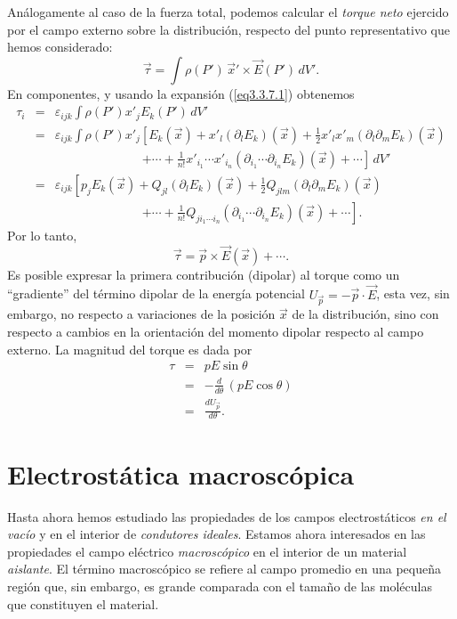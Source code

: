 Análogamente al caso de la fuerza total, podemos calcular el \textit{torque
neto} ejercido por el campo externo sobre la distribución, respecto del punto
representativo que hemos considerado:
\begin{equation}
\vec{\tau} = \int \rho(P')\,\vec{x}'\times\vec{E}(P')\,dV' .
\end{equation}
En componentes, y usando la expansión (\ref{eq3.3.7.1}) obtenemos
\begin{eqnarray}
\tau_i &=& \varepsilon_{ijk}\int\rho(P')x'_jE_k(P')\,dV' \\
&=&\varepsilon_{ijk}\int\rho(P')x'_j\left[
E_k(\vec{x})+x'_l(\partial_lE_k)(\vec{x})+\frac{1}{2}
x'_lx'_m(\partial_l\partial_mE_k)(\vec{x}) \right.\nonumber\\
&&\quad\qquad\qquad\qquad\left.+\cdots+\frac{1}{n!}x'_{i_1}\cdots
x'_{i_n}(\partial_{i_1}\cdots\partial_{i_n}E_k)(\vec
{x})+\cdots\right] \,dV' \\
&=&\varepsilon_{ijk}\left[p_j
E_k(\vec{x})+Q_{jl}(\partial_lE_k)(\vec{x})+\frac{1}{2}
Q_{jlm}(\partial_l\partial_mE_k)(\vec{x})\right.\nonumber\\
&&\quad\qquad\qquad\qquad\left.+\cdots+\frac{1}{n!}Q_{ji_1\cdots i_n}(\partial_{i_1}\cdots\partial_{i_n}
E_k)(\vec
{x})+\cdots\right] .
\end{eqnarray}
Por lo tanto,
\begin{equation}
\label{eq3.3.14}
\boxed{\vec{\tau}=\vec{p}\times\vec{E}(\vec{x})+\cdots. }
\end{equation}
Es posible expresar la primera contribución (dipolar) al torque como un
``gradiente'' del término dipolar de la energía potencial
$U_{\vec{p}}=-\vec{p}\cdot\vec{E}$, esta vez, sin embargo, no respecto a
variaciones de la posición $\vec{x}$ de la distribución, sino con respecto a
cambios en la orientación del momento dipolar respecto al campo
externo. La magnitud del torque es dada por
\begin{eqnarray}
\tau &=& pE\sin\theta \nonumber \\
&=& -\frac{d}{d\theta}\,\left(pE\cos\theta\right)\\
&=&\frac{dU_{\vec{p}}}{d\theta}.  \label{eq3.3.15}
\end{eqnarray}

\newpage


\newpage

\section{Electrostática macroscópica}
Hasta ahora hemos estudiado las propiedades de los campos
electrostáticos \textit{en el vacío} y en el interior de \textit{condutores ideales}.
Estamos ahora interesados en las propiedades el campo eléctrico \textit{macroscópico} en el interior de un material \textit{aislante}. El término macroscópico se refiere al campo promedio en una peque\~na región que, sin embargo, es grande comparada con el tama\~no de las moléculas que constituyen el material.

